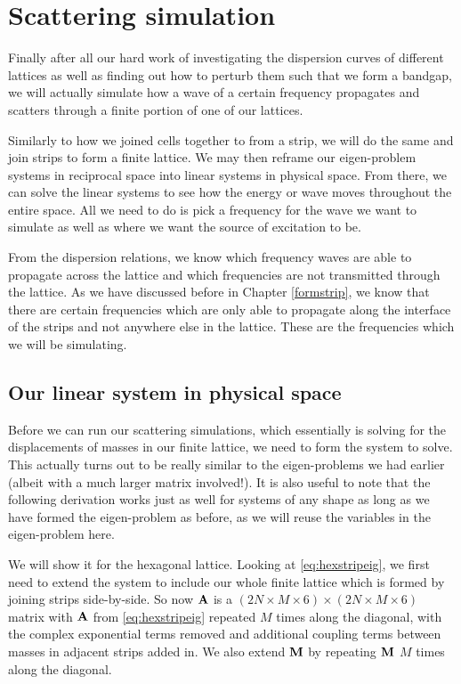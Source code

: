 \chapter{Scattering simulation}
\label{scattering}
Finally after all our hard work of investigating the dispersion curves of
different lattices as well as finding out how to perturb them such that we form
a bandgap, we will actually simulate how a wave of a certain frequency
propagates and scatters through a finite portion of one of our lattices.

Similarly to how we joined cells together to from a strip, we will do the same
and join strips to form a finite lattice. We may then reframe our eigen-problem
systems in reciprocal space into linear systems in physical space. From there,
we can solve the linear systems to see how the energy or wave moves throughout
the entire space. All we need to do is pick a frequency for the wave we want to
simulate as well as where we want the source of excitation to be.

From the dispersion relations, we know which frequency waves are able to
propagate across the lattice and which frequencies are not transmitted through
the lattice. As we have discussed before in Chapter \ref{formstrip}, we know
that there are certain frequencies which are only able to propagate along the
interface of the strips and not anywhere else in the lattice. These are the
frequencies which we will be simulating.

\section{Our linear system in physical space}
Before we can run our scattering simulations, which essentially is solving for
the displacements of masses in our finite lattice, we need to form the system
to solve. This actually turns out to be really similar to the eigen-problems we
had earlier (albeit with a much larger matrix involved!). It is also useful to
note that the following derivation works just as well for systems of any shape
as long as we have formed the eigen-problem as before, as we will reuse the
variables in the eigen-problem here.
 
We will show it for the hexagonal lattice. Looking at \eqref{eq:hexstripeig},
we first need to extend the system to include our whole finite lattice which is
formed by joining strips side-by-side. So now $\mathbf{A}$ is a $(2N \times M
\times 6) \times (2N \times M \times 6)$ matrix with $\mathbf{A}$ from
\eqref{eq:hexstripeig} repeated $M$ times along the diagonal, with the complex
exponential terms removed and additional coupling terms between masses in
adjacent strips added in. We also extend $\mathbf{M}$ by repeating $\mathbf{M}$ $M$
times along the diagonal.

